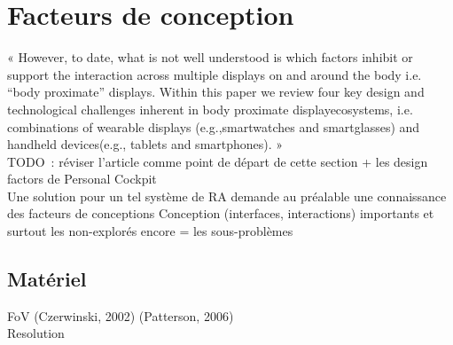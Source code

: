 \iffalse
TODO Maîtrise~:
1. Lire et cerner 
   [a] la problématique -> DONE
   [b] les sous-problèmes + objectifs
2. Lister et classer les facteurs de design possibles -> DONE
3. Définir les paramètres (design factors) d'interfaces et d'interactions -> DONE
4. Lister les tâches possibles de 
   [a] test 
   et [b] d'application 
   + [c] schémas de résumé
5. Concevoir les interfaces et les interactions pour chaque tâche~:
   [a] navigation, 
   [b] sélection et manipulation
6. Concevoir les expérimentations 
   + Déterminer quelles mesures possibles pour chaque interface x interaction
7. Préparer les expérimentations 
   + Réaliser le prototype pour répondre à(aux) expérimentation(s)
8. Réaliser les expérimentations
9. Apprendre à analyser les données d'expérimentations
   + Analyser les données des expérimentations
10. Écrire l'article et l'envoyer
11. Déterminer ce qui est nécessaire pour terminer le mémoire
12. Écrire le mémoire et le faire valider
13. Passer la soutenance
\fi



\section*{Facteurs de conception}
« However, to date, what is not well understood is which factors inhibit or support the interaction across multiple displays on and around the body i.e. “body proximate” displays. Within this paper we review four key design and technological challenges inherent in body proximate displayecosystems, i.e. combinations of wearable displays (e.g.,smartwatches and smartglasses) and handheld devices(e.g., tablets and smartphones). » \cite{GrubertKranzQuigley2015} \\
TODO~: réviser l'article comme point de départ de cette section + les design factors de Personal Cockpit \\

Une solution pour un tel système de RA demande au préalable une connaissance des facteurs de conceptions
Conception (interfaces, interactions) importants et surtout les non-explorés encore = les sous-problèmes


\subsection*{Matériel}
        FoV (Czerwinski, 2002) (Patterson, 2006) \cite{KishishitaKiyokawaOrloskyEtAl2014} \\

        Resolution \\


